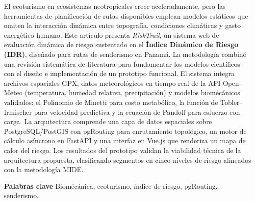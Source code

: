 \documentclass[10pt,letterpaper,twocolumn]{article}
\begin{document}
  \enspace
  El ecoturismo en ecosistemas neotropicales crece aceleradamente, pero
  las herramientas de planificaci\'{o}n de rutas disponibles emplean modelos
  est\'{a}ticos que omiten la interacci\'{o}n din\'{a}mica entre topograf\'{i}a,
  condiciones clim\'{a}ticas y gasto energ\'{e}tico humano. Este
  art\'{i}culo presenta \emph{RiskTrail}, un sistema web de evaluaci\'{o}n
  din\'{a}mica de riesgo sustentado en el \textbf{\'{I}ndice Din\'{a}mico
  de Riesgo (IDR)}, dise\~{n}ado para rutas de senderismo en Panam\'{a}.
  La metodolog\'{i}a combin\'{o} una revisi\'{o}n sistem\'{a}tica de
  literatura para fundamentar los modelos cient\'{i}ficos con el dise\~{n}o
  e implementaci\'{o}n de un prototipo funcional. El sistema integra
  archivos espaciales GPX, datos meteorol\'{o}gicos en tiempo real de la
  API Open-Meteo (temperatura, humedad relativa, precipitaci\'{o}n) y
  modelos biom\'{e}c\'{a}nicos validados: el Polinomio de Minetti para
  costo metab\'{o}lico, la funci\'{o}n de Tobler--Irmischer para velocidad
  predictiva y la ecuaci\'{o}n de Pandolf para esfuerzo con carga. La
  arquitectura comprende una capa de datos espaciales sobre
  PostgreSQL/PostGIS con pgRouting para enrutamiento topol\'{o}gico, un
  motor de c\'{a}lculo as\'{i}ncrono en FastAPI y una interfaz en Vue.js
  que renderiza un mapa de calor del riesgo. Los resultados del prototipo
  validan la viabilidad t\'{e}cnica de la arquitectura propuesta,
  clasificando segmentos en cinco niveles de riesgo alineados con la
  metodolog\'{i}a MIDE.\par
  \vspace{4pt}
  \noindent\textbf{Palabras clave}\enspace
  Biom\'{e}c\'{a}nica, ecoturismo, \'{i}ndice de riesgo, pgRouting,
  senderismo.\par
  \vspace{10pt}
\end{document}
